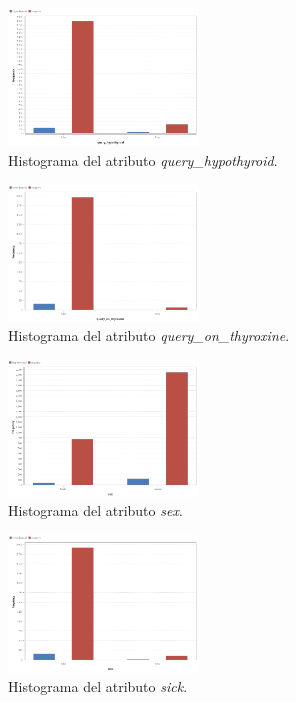 \documentclass[osajnl,twocolumn,showpacs,superscriptaddress,10pt,floatfix]{revtex4-1} %
\begin{document}
\begin{figure}[H]
    \centering
    \includegraphics[width=0.45\textwidth]{analysis/histogram_query_hypothyroid}
    \caption{Histograma del atributo \textit{query\_hypothyroid}.}
    \label{figure:query_hypothyroid}
\end{figure}

\begin{figure}[H]
    \centering
    \includegraphics[width=0.45\textwidth]{analysis/histogram_query_on_thyroxine}
    \caption{Histograma del atributo \textit{query\_on\_thyroxine}.}
    \label{figure:query_on_thyroxine}
\end{figure}

\begin{figure}[H]
    \centering
    \includegraphics[width=0.45\textwidth]{analysis/histogram_sex}
    \caption{Histograma del atributo \textit{sex}.}
    \label{figure:sex}
\end{figure}

\begin{figure}[H]
    \centering
    \includegraphics[width=0.45\textwidth]{analysis/histogram_sick}
    \caption{Histograma del atributo \textit{sick}.}
    \label{figure:sick}
\end{figure}
\end{document}
